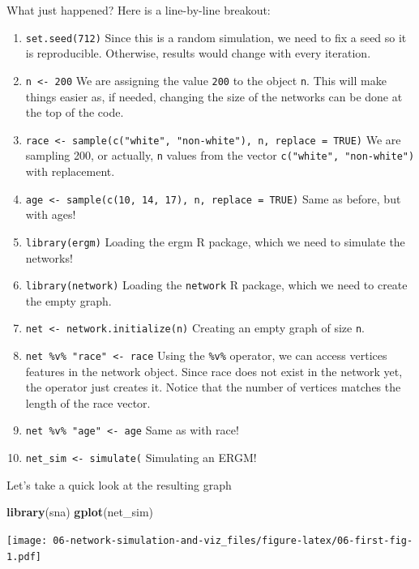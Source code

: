 \documentclass[]{book}
\newenvironment{Shaded}{\begin{snugshade}}{\end{snugshade}}
\newcommand{\KeywordTok}[1]{\textcolor[rgb]{0.13,0.29,0.53}{\textbf{#1}}}
\newcommand{\NormalTok}[1]{#1}
\begin{document}
What just happened? Here is a line-by-line breakout:

\begin{enumerate}
\def\labelenumi{\arabic{enumi}.}
\item
  \texttt{set.seed(712)} Since this is a random simulation, we need to fix a seed so it is reproducible. Otherwise, results would change with every iteration.
\item
  \texttt{n\ \textless{}-\ 200} We are assigning the value \texttt{200} to the object \texttt{n}. This will make things easier as, if needed, changing the size of the networks can be done at the top of the code.
\item
  \texttt{race\ \textless{}-\ sample(c("white",\ "non-white"),\ n,\ replace\ =\ TRUE)} We are sampling 200, or actually, \texttt{n} values from the vector \texttt{c("white",\ "non-white")} with replacement.
\item
  \texttt{age\ \textless{}-\ sample(c(10,\ 14,\ 17),\ n,\ replace\ =\ TRUE)} Same as before, but with ages!
\item
  \texttt{library(ergm)} Loading the ergm R package, which we need to simulate the networks!
\item
  \texttt{library(network)} Loading the \texttt{network} R package, which we need to create the empty graph.
\item
  \texttt{net\ \textless{}-\ network.initialize(n)} Creating an empty graph of size \texttt{n}.
\item
  \texttt{net\ \%v\%\ "race"\ \textless{}-\ race} Using the \texttt{\%v\%} operator, we can access vertices features in the network object. Since race does not exist in the network yet, the operator just creates it. Notice that the number of vertices matches the length of the race vector.
\item
  \texttt{net\ \%v\%\ "age"\ \textless{}-\ age} Same as with race!
\item
  \texttt{net\_sim\ \textless{}-\ simulate(} Simulating an ERGM!
\end{enumerate}

Let's take a quick look at the resulting graph

\begin{Shaded}
\begin{Highlighting}[]
\KeywordTok{library}\NormalTok{(sna)}
\KeywordTok{gplot}\NormalTok{(net_sim)}
\end{Highlighting}
\end{Shaded}

\texttt{[image: 06-network-simulation-and-viz\_files/figure-latex/06-first-fig-1.pdf]}
\end{document}
